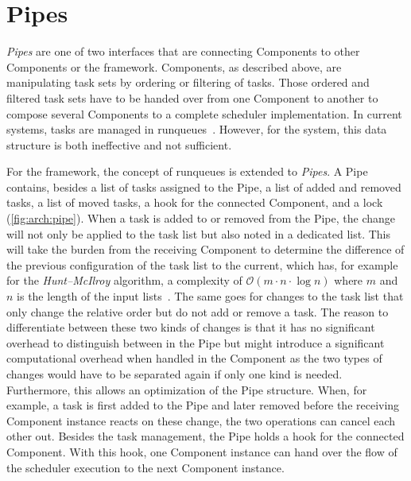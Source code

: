 \section{Pipes}%
\label{sec:arch:pipes}

\emph{Pipes} are one of two interfaces that are connecting Components to other Components or the framework. Components, as described above, are manipulating task sets by ordering or filtering of tasks. Those ordered and filtered task sets have to be handed over from one Component to another to compose several Components to a complete scheduler implementation. In current systems, tasks are managed in runqueues~\cite[Ch.~9]{Stallings-2011-OperatingSystems}\cite[Ch.~2]{Tanenbaum-2007-ModernOS}\cite[]{FreeBSD11}\cite[]{Linux44}. However, for the \cobas{} system, this data structure is both ineffective and not sufficient.

For the \cobas{} framework, the concept of runqueues is extended to \emph{Pipes}. A Pipe contains, besides a list of tasks assigned to the Pipe, a list of added and removed tasks, a list of moved tasks, a hook for the connected Component, and a lock (\cref{fig:arch:pipe}). When a task is added to or removed from the Pipe, the change will not only be applied to the task list but also noted in a dedicated list. This will take the burden from the receiving Component to determine the difference of the previous configuration of the task list to the current, which has, for example for the \emph{Hunt–McIlroy} algorithm, a complexity of \(\mathcal{O}(m \cdot n \cdot \log n )\) where \(m\) and \(n\) is the length of the input lists~\cite{Hunt-1976-Diff}. The same goes for changes to the task list that only change the relative order but do not add or remove a task. The reason to differentiate between these two kinds of changes is that it has no significant overhead to distinguish between in the Pipe but might introduce a significant computational overhead when handled in the Component as the two types of changes would have to be separated again if only one kind is needed. Furthermore, this allows an optimization of the Pipe structure. When, for example, a task is first added to the Pipe and later removed before the receiving Component instance reacts on these change, the two operations can cancel each other out. Besides the task management, the Pipe holds a hook for the connected Component. With this hook, one Component instance can hand over the flow of the scheduler execution to the next Component instance.


